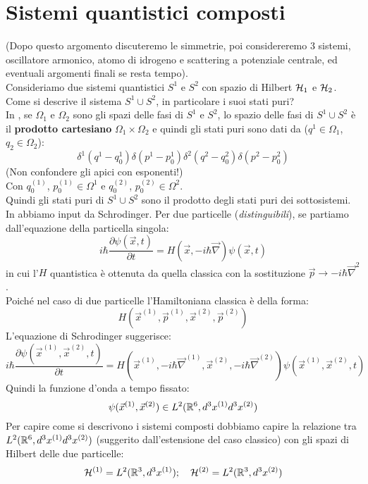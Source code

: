 \documentclass[../../FisicaTeorica.tex]{subfiles}
\begin{document}
\section{Sistemi quantistici composti}
(Dopo questo argomento discuteremo le simmetrie, poi considereremo 3 sistemi, oscillatore armonico, atomo di idrogeno e scattering a potenziale centrale, ed eventuali argomenti finali se resta tempo).\\
Consideriamo due sistemi quantistici $S^1$ e $S^2$ con spazio di Hilbert $\mathcal{H}_1$ e $\mathcal{H}_2$. Come si descrive il sistema $S^1 \cup S^2$, in particolare i suoi stati puri?\\
In \MC, se $\Omega_1$ e $\Omega_2$ sono gli spazi delle fasi di $S^1$ e $S^2$, lo spazio delle fasi di $S^1 \cup S^2$ è il \textbf{prodotto cartesiano} $\Omega_1\times \Omega_2$ e quindi gli stati puri sono dati da ($q^1 \in \Omega_1$, $q_2 \in \Omega_2$):
\[
\delta^1 (q^1-q_0^1)\delta(p^1-p_0^1) \delta^2(q^2-q_0^2)\delta(p^2-p_0^2)
\] 
(Non confondere gli apici con esponenti!)\\
Con $q_0^{(1)}$, $p_0^{(1)} \in \Omega^1$ e $q_0^{(2)}$, $p_0^{(2)}\in \Omega^2$.\\
Quindi gli stati puri di $S^1 \cup S^2$ sono il prodotto degli stati puri dei sottosistemi.\\
In \MQ abbiamo input da Schrodinger. 
Per due particelle (\textit{distinguibili}), se partiamo dall'equazione della particella singola:
\[
i\hbar \frac{\partial \psi(\vec{x},t)}{\partial t}=H(\vec{x}, -i\hbar\vec{\nabla})\psi(\vec{x},t)
\]
in cui l'$H$ quantistica è ottenuta da quella classica con la sostituzione $\vec{p} \to -i\hbar\vec{\nabla}^2$.\\
Poiché nel caso di due particelle l'Hamiltoniana classica è della forma:
\[
H(\vec{x}^{(1)}, \vec{p}^{(1)}, \vec{x}^{(2)}, \vec{p}^{(2)})
\]
L'equazione di Schrodinger suggerisce: %
\[
i\hbar \frac{\partial \psi(\vec{x}^{(1)}, \vec{x}^{(2)},t)}{\partial t} = H(\vec{x}^{(1)},-i\hbar \vec{\nabla}^{(1)}, \vec{x}^{(2)}, -i\hbar\vec{\nabla}^{(2)})\psi(\vec{x}^{(1)},\vec{x}^{(2)},t)
\]
Quindi la funzione d'onda a tempo fissato:
\[
\psi(\vec{x}^{(1)}, \vec{x}^{(2)})\in L^2(\mathbb{R}^6, d^3 x^{(1)} d^3 x^{(2)})
\]
Per capire come si descrivono i sistemi composti dobbiamo capire la relazione tra $L^2(\mathbb{R}^6, d^3 x^{(1)} d^3 x^{(2)})$ (suggerito dall'estensione del caso classico) con gli spazi di Hilbert delle due particelle:
\[
\mathcal{H}^{(1)}=L^2(\mathbb{R}^3, d^3 x^{(1)}); \quad \mathcal{H}^{(2)}=L^2(\mathbb{R}^3, d^3 x^{(2)})
\]
\end{document}
